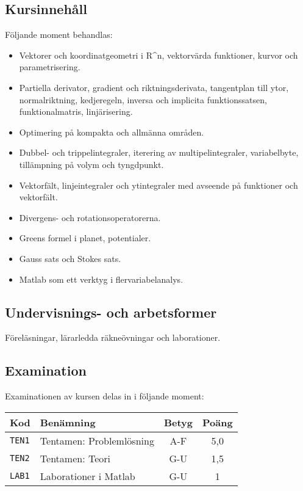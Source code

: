 \subsection*{Kursinnehåll}

Följande moment behandlas:

\begin{itemize}
\tightlist
\item
  Vektorer och koordinatgeometri i R\^{}n, vektorvärda funktioner,
  kurvor och parametrisering.
\item
  Partiella derivator, gradient och riktningsderivata, tangentplan till
  ytor, normalriktning, kedjeregeln, inversa och implicita
  funktionssatsen, funktionalmatris, linjärisering.
\item
  Optimering på kompakta och allmänna områden.
\item
  Dubbel- och trippelintegraler, iterering av multipelintegraler,
  variabelbyte, tillämpning på volym och tyngdpunkt.
\item
  Vektorfält, linjeintegraler och ytintegraler med avseende på
  funktioner och vektorfält.
\item
  Divergens- och rotationsoperatorerna.
\item
  Greens formel i planet, potentialer.
\item
  Gauss sats och Stokes sats.
\item
  Matlab som ett verktyg i flervariabelanalys.
\end{itemize}

\subsection*{Undervisnings- och
arbetsformer}

Föreläsningar, lärarledda räkneövningar och laborationer.

\subsection*{Examination}

Examinationen av kursen delas in i följande moment:

\begin{longtable}[]{@{}llcc@{}}
\toprule
\textsf{Kod} & \textsf{Benämning} & \textsf{Betyg} & \textsf{Poäng}\tabularnewline
\midrule
\endhead
\texttt{TEN1} & Tentamen: Problemlösning & A-F & 5,0\tabularnewline
\texttt{TEN2} & Tentamen: Teori & G-U & 1,5\tabularnewline
\texttt{LAB1} & Laborationer i Matlab & G-U & 1\tabularnewline
\bottomrule
\end{longtable}

